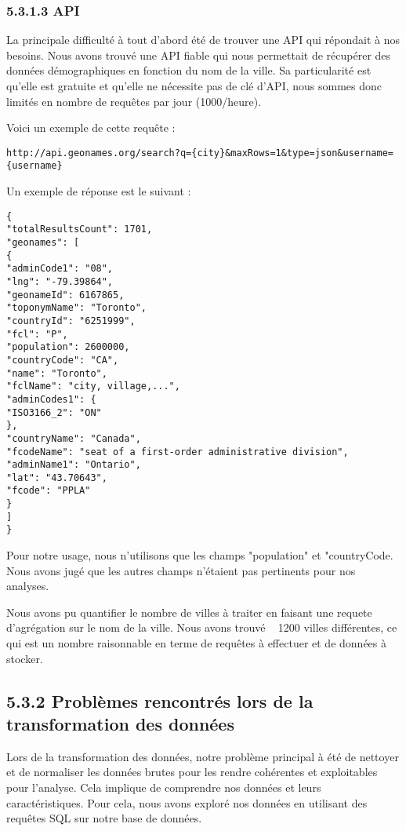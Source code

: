 \subsubsection{5.3.1.3 API}

La principale difficulté à tout d'abord été de trouver une API qui répondait à nos besoins.
Nous avons trouvé une API fiable qui nous permettait de récupérer des données démographiques en fonction du nom de la ville.
Sa particularité est qu'elle est gratuite et qu'elle ne nécessite pas de clé d'API, nous sommes donc limités en nombre de requêtes par jour (1000/heure).

Voici un exemple de cette requête :

\begin{verbatim}
http://api.geonames.org/search?q={city}&maxRows=1&type=json&username={username}
\end{verbatim}

Un exemple de réponse est le suivant :

\begin{verbatim}
{
"totalResultsCount": 1701,
"geonames": [
{
"adminCode1": "08",
"lng": "-79.39864",
"geonameId": 6167865,
"toponymName": "Toronto",
"countryId": "6251999",
"fcl": "P",
"population": 2600000,
"countryCode": "CA",
"name": "Toronto",
"fclName": "city, village,...",
"adminCodes1": {
"ISO3166_2": "ON"
},
"countryName": "Canada",
"fcodeName": "seat of a first-order administrative division",
"adminName1": "Ontario",
"lat": "43.70643",
"fcode": "PPLA"
}
]
}
\end{verbatim}

Pour notre usage, nous n'utilisons que les champs "population" et "countryCode. Nous avons jugé que les autres champs n'étaient pas pertinents pour nos analyses.

Nous avons pu quantifier le nombre de villes à traiter en faisant une requete d'agrégation sur le nom de la ville.
Nous avons trouvé ~ 1200 villes différentes, ce qui est un nombre raisonnable en terme de requêtes à effectuer et de données à stocker.

\subsection{5.3.2 Problèmes rencontrés lors de la transformation des données}

Lors de la transformation des données, notre problème principal à été de nettoyer et de normaliser les données brutes pour les rendre cohérentes et exploitables pour l’analyse.
Cela implique de comprendre nos données et leurs caractéristiques.
Pour cela, nous avons exploré nos données en utilisant des requêtes SQL sur notre base de données.

